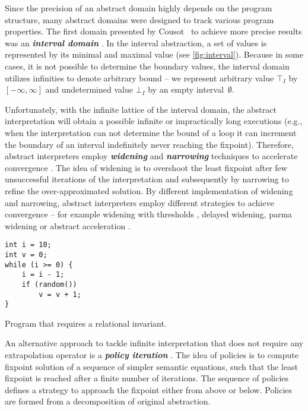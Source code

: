 Since the precision of an abstract domain highly depends on the program
structure, many abstract domains were designed to track various program
properties. The first domain presented by Cousot~\cite{Cousot1977} to
achieve more precise results was an \textbf{\emph{interval domain}} .
In the interval abstraction, a set of values is represented by its minimal and
maximal value (see \autoref{fig:interval}).  Because in some cases, it is not
possible to determine the boundary values, the interval domain utilizes
infinities to denote arbitrary bound -- we represent arbitrary value
$\top_{\textit{I}}$ by $[-\infty, \infty]$ and undetermined value
$\bot_{\textit{I}}$ by an empty interval~$\emptyset$.

Unfortunately, with the infinite lattice of the interval
domain, the
abstract interpretation will obtain a possible infinite or impractically long
executions (e.g., when the interpretation can not determine the bound of a loop
it can increment the boundary of an interval indefinitely never reaching the
fixpoint). Therefore, abstract interpreters employ \textbf{\emph{widening}} and
\textbf{\emph{narrowing}} techniques to accelerate convergence \cite{Cousot1992a,
Cortesi2011}.  The idea of wi\-de\-ning is to overshoot the least fixpoint
after few unsuccessful iterations of the interpretation and subsequently by
narrowing to refine the over-approximated solution. By different implementation
of widening and narrowing, abstract interpreters employ different strategies to
achieve convergence -- for example widening with thresholds \cite{Blanchet2003,
Lakhdar2011}, delayed widening, parma widening \cite{Bagnara2008} or abstract
acceleration \cite{Gonnord2006, Feautrier2010}.

\begin{marginfigure}
\begin{verbatim}
int i = 10;
int v = 0;
while (i >= 0) {
    i = i - 1;
    if (random())
        v = v + 1;
}
\end{verbatim}
    \caption{Program that requires a relational invariant.}
    \label{fig:relationalc}
\end{marginfigure}

An alternative approach to tackle infinite interpretation that does not require
any extrapolation operator is a \textbf{\emph{policy iteration}}
\cite{Costan2005, Gaubert2007, Gawlitza2007, Gawlitza2007b, Gawlitza2011}. The
idea of policies is to compute fixpoint solution of a sequence of simpler
semantic equations, such that the least fixpoint is reached after a finite
number of iterations.  The sequence of policies defines a strategy to approach
the fixpoint either from above or below. Policies are formed from a
decomposition of original abstraction.

